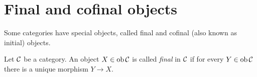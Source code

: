%
%
%
%


\section{Final and cofinal objects}

Some categories have special objects, called final and cofinal (also known as initial) objects. 

\begin{definition}
Let ${\mathcal{C}}$ be a category. An object $X\in \operatorname{ob} {\mathcal{C}}$ is called \emph{final} in ${\mathcal{C}}$ if for every $Y\in \operatorname{ob}{\mathcal{C}}$ there is a 
unique morphism $Y \to X$.
\end{definition}

